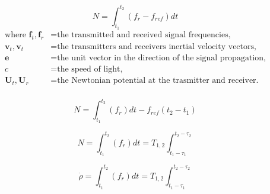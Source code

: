 \begin{equation}
    N = \int_{t_1}^{t_2}(f_r-f_{ref})dt
\end{equation}
\begin{equation*}
    \begin{aligned}
        \textrm{where  }
        \mathbf{f}_t, \mathbf{f}_r & = \textrm{the transmitted and received signal frequencies,}            \\
        \mathbf{v}_t, \mathbf{v}_t & = \textrm{the transmitters and receivers inertial velocity vectors,}   \\
        \mathbf{e}                 & = \textrm{the unit vector in the direction of the signal propagation,} \\
        c                          & = \textrm{the speed of light,}                                         \\
        \mathbf{U}_t, \mathbf{U}_r & = \textrm{the Newtonian potential at the trasmitter and receiver.}     \\
    \end{aligned}
\end{equation*}

\begin{equation}
    N = \int_{t_1}^{t_2}(f_r)dt-f_{ref}(t_2-t_1)
\end{equation}

\begin{equation}
    N = \int_{t_1}^{t_2}(f_r)dt = T_{1,2}\int_{t_1-\tau_1}^{t_2-\tau_2}
\end{equation}

\begin{equation}
    \dot{\rho} = \int_{t_1}^{t_2}(f_r)dt = T_{1,2}\int_{t_1-\tau_1}^{t_2-\tau_2}
\end{equation}





